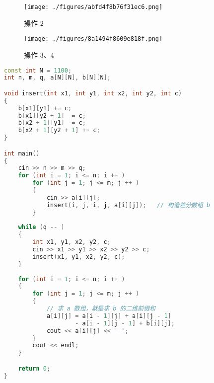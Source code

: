 \begin{figure}[ht]
\centering
\texttt{[image: ./figures/abfd4f8b76f31ec6.png]}
\caption{操作 $2$} \label{fig_AD_2}
\end{figure}

\begin{figure}[ht]
\centering
\texttt{[image: ./figures/8a1494f8609e818f.png]}
\caption{操作 $3$、$4$} \label{fig_AD_3}
\end{figure}

\begin{lstlisting}[language=cpp]
const int N = 1100;
int n, m, q, a[N][N], b[N][N];

void insert(int x1, int y1, int x2, int y2, int c)
{
    b[x1][y1] += c;
    b[x1][y2 + 1] -= c;
    b[x2 + 1][y1] -= c;
    b[x2 + 1][y2 + 1] += c;
}

int main()
{
    cin >> n >> m >> q;
    for (int i = 1; i <= n; i ++ ) 
        for (int j = 1; j <= m; j ++ )
        {
            cin >> a[i][j];
            insert(i, j, i, j, a[i][j]);   // 构造差分数组 b
        }
        
    while (q -- )
    {
        int x1, y1, x2, y2, c;
        cin >> x1 >> y1 >> x2 >> y2 >> c;
        insert(x1, y1, x2, y2, c);
    }
    
    for (int i = 1; i <= n; i ++ ) 
    {
        for (int j = 1; j <= m; j ++ )
        {
            // 求 a 数组，就是求 b 的二维前缀和
            a[i][j] = a[i - 1][j] + a[i][j - 1] 
                    - a[i - 1][j - 1] + b[i][j];    
            cout << a[i][j] << ' ';
        }
        cout << endl;
    }

    return 0;
}
\end{lstlisting}